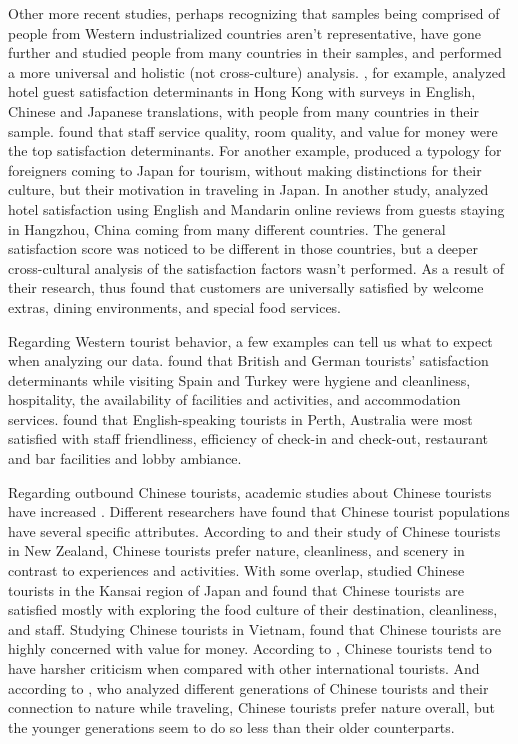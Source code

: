 \documentclass[review]{elsarticle}
\begin{document}
Other more recent studies, perhaps recognizing that samples being comprised of people from Western industrialized countries aren't representative, have gone further and studied people from many countries in their samples, and performed a more universal and holistic (not cross-culture) analysis. \cite{choi2001}, for example, analyzed hotel guest satisfaction determinants in Hong Kong with surveys in English, Chinese and Japanese translations, with people from many countries in their sample. \cite{choi2001} found that staff service quality, room quality, and value for money were the top satisfaction determinants. For another example, \cite{Uzama2012} produced a typology for foreigners coming to Japan for tourism, without making distinctions for their culture, but their motivation in traveling in Japan. In another study, \cite{zhou2014} analyzed hotel satisfaction using English and Mandarin online reviews from guests staying in Hangzhou, China coming from many different countries. The general satisfaction score was noticed to be different in those countries, but a deeper cross-cultural analysis of the satisfaction factors wasn't performed. As a result of their research, \cite{zhou2014} thus found that customers are universally satisfied by welcome extras, dining environments, and special food services. 

Regarding Western tourist behavior, a few examples can tell us what to expect when analyzing our data. \cite{kozak2002} found that British and German tourists' satisfaction determinants while visiting Spain and Turkey were hygiene and cleanliness, hospitality, the availability of facilities and activities, and accommodation services. \cite{shanka2004} found that English-speaking tourists in Perth, Australia were most satisfied with staff friendliness, efficiency of check-in and check-out, restaurant and bar facilities and lobby ambiance. 

Regarding outbound Chinese tourists, academic studies about Chinese tourists have increased \cite[][]{sun2017}. Different researchers have found that Chinese tourist populations have several specific attributes. According to \cite{ryan2001} and their study of Chinese tourists in New Zealand, Chinese tourists prefer nature, cleanliness, and scenery in contrast to experiences and activities. With some overlap, \cite{dongyang2015} studied Chinese tourists in the Kansai region of Japan and found that Chinese tourists are satisfied mostly with exploring the food culture of their destination, cleanliness, and staff. Studying Chinese tourists in Vietnam, \cite{truong2009} found that Chinese tourists are highly concerned with value for money. According to \cite{liu2019}, Chinese tourists tend to have harsher criticism when compared with other international tourists. And according to \cite{gao2017chinese}, who analyzed different generations of Chinese tourists and their connection to nature while traveling, Chinese tourists prefer nature overall, but the younger generations seem to do so less than their older counterparts. 
\end{document}

